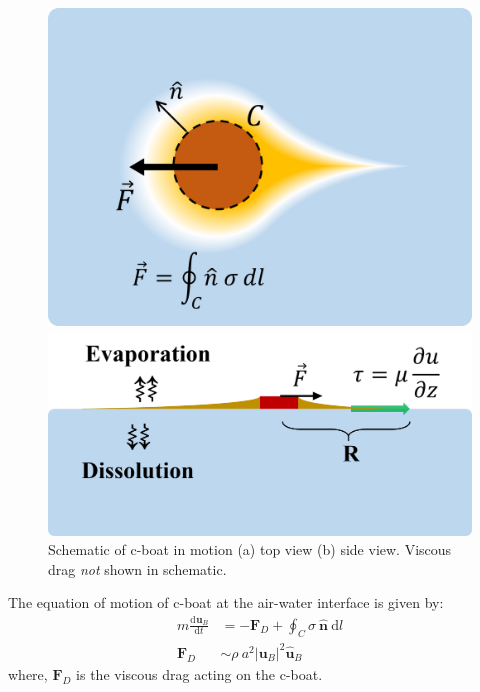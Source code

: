 \documentclass[aps, twocolumn, floatfix, superscriptaddress]{revtex4}
\newcommand{\tdc}[3][]{\frac{\mathrm{d}^{#1}#2}{\mathrm{d}#3^{#1}}} %
\newcommand{\td}[1]{\mathrm{d}#1}
\begin{document}
\begin{figure}[h!]
    \centering
	\begin{minipage}[c]{0.45\linewidth}
		\centering
		\includegraphics[width=\textwidth]{figure2_v2.png}
	\end{minipage}\hspace{0.25cm}
	\begin{minipage}[c]{0.45\linewidth}
		\centering
		\includegraphics[width=\textwidth]{figure3_v2.png}
	\end{minipage}
	\caption{Schematic of c-boat in motion (a) top view (b) side view. Viscous drag \emph{not} shown in schematic.}\label{fig:schematic}
\end{figure}
The equation of motion of c-boat at the air-water interface is given by:
\begin{equation}\label{eq:eomgeneral}
\begin{aligned}
m \tdc{\mathbf{u}_{B}}{t} &= -\mathbf{F}_{D} + \oint_{C} \sigma \ \hat{\mathbf{n}} \ \td{l} \\
\mathbf{F}_{D} &\sim \rho\ a^{2} \left|\mathbf{u}_{B}\right|^{2} \hat{\mathbf{u}}_{B}
\end{aligned}
\end{equation}
where, $\mathbf{F}_{D}$ is the viscous drag acting on the c-boat. 
\end{document}
